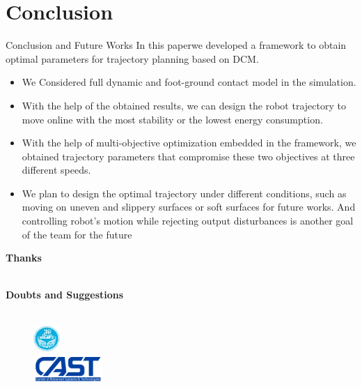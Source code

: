 \documentclass[aspectratio=169,t,xcolor=table]{beamer}
\begin{document}
\section{Conclusion}

\begin{frame}{Conclusion and Future Works}
    In this paperwe developed a framework to obtain optimal
parameters for trajectory planning based on DCM.
    \begin{itemize}
		\item We Considered full dynamic and foot-ground contact model in the simulation.
        \item With the help of the obtained results, we can design the robot trajectory to move online with the most stability or the lowest energy consumption.
		\item With the help of multi-objective optimization embedded in the
framework, we obtained trajectory parameters that compromise these two objectives at three different speeds.
\item We plan to design the optimal trajectory under different
conditions, such as moving on uneven and slippery surfaces
or soft surfaces for future works. And controlling robot’s motion while rejecting output
disturbances is another goal of the team for the future
    \end{itemize}
    
\end{frame}

\begin{frame}
    
    \centering
    \vspace{2cm}
    
    \textbf{\Huge Thanks}
    
    \ \\
    
    \textbf{Doubts and Suggestions}
    \ \\
    
    \ \\
    
    
    \vspace{0.5cm}
    \begin{figure}
        \centering
        \includegraphics[height=1cm]{lib/logos/UofT.png}\\
        \vspace{0.5cm}
        \includegraphics[height=1cm]{lib/logos/cast.png}\\
    \end{figure}
    
\end{frame}

\titlepage
\end{document}
